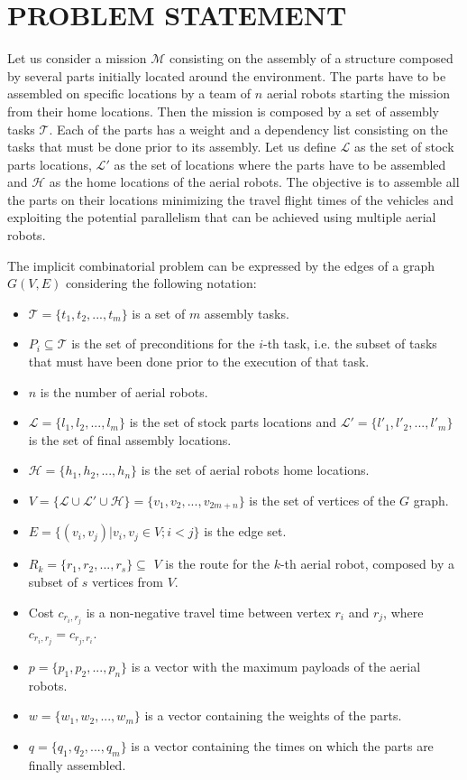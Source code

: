 \documentclass[letterpaper, 10 pt, conference]{ieeeconf}  %
\begin{document}
\section{PROBLEM STATEMENT}
	\label{sec:pdef}

Let us consider a mission $\mathcal{M}$ consisting on the assembly of a structure composed by several parts initially located around the environment. The parts have to be assembled on specific locations by a team of $n$ aerial robots starting the mission from their home locations. Then the mission is composed by a set of assembly tasks $\mathcal{T}$. Each of the parts has a weight and a dependency list consisting on the tasks that must be done prior to its assembly. Let us define $\mathcal{L}$ as the set of stock parts locations, $\mathcal{L'}$ as the set of locations where the parts have to be assembled and $\mathcal{H}$ as the home locations of the aerial robots. The objective is to assemble all the parts on their locations minimizing the travel flight times of the vehicles and exploiting the potential parallelism that can be achieved using multiple aerial robots.
    
The implicit combinatorial problem can be expressed by the edges of a graph $G(V,E)$ considering the following notation:
    
    \begin{itemize}
    	\item $\mathcal{T} = \{t_1, t_2, ..., t_m\}$ is a set of $m$ assembly tasks.
    	\item ${P_{i}} \subseteq \mathcal{T}  $ is the set of preconditions for the $i$-th task, i.e. the subset of tasks that must have been done prior to the execution of that task.
    	\item $n$ is the number of aerial robots.
    	\item $\mathcal{L} = \{l_1, l_2, ..., l_m\}$ is the set of stock parts locations and $\mathcal{L'} = \{l'_1, l'_2, ..., l'_m\}$ is the set of final assembly locations.    
    	\item $\mathcal{H} = \{h_1, h_2, ..., h_n\}$ is the set of aerial robots home locations.
  		\item $V=\{\mathcal{L}\cup\mathcal{L'}\cup\mathcal{H}\}=\{v_1, v_2, ..., v_{2m+n}\}$ is the set of vertices of the $G$ graph.
		\item $E=\{(v_i,v_j) | v_i,v_j \in V; i<j\}$ is the edge set.  		
  		\item ${R_{k} = \{r_1, r_2, ..., r_s} \}\subseteq$ $V$ is the route for the $k$-th aerial robot, composed by a subset of $s$ vertices from $V$.
		\item Cost $c_{r_i,r_j}$ is a non-negative travel time between vertex $r_i$ and $r_j$, where $c_{r_i,r_j}=c_{r_j,r_i}$.
		\item $p = \{p_1, p_2, ..., p_n\}$ is a vector with the maximum payloads of the aerial robots.
		\item $w = \{w_1, w_2, ..., w_m\}$ is a vector containing the weights of the parts.
		\item $q = \{q_1, q_2, ..., q_m\}$ is a vector containing the times on which the parts are finally assembled.
	\end{itemize}
	
\end{document}
